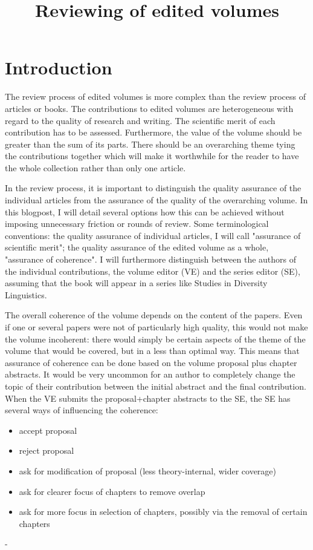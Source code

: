 \documentclass[border=20pt]{article}
\date{}
\title{Reviewing of edited volumes}
\begin{document}
 
\maketitle
\section*{Introduction}

\pagestyle{empty}

The review process of edited volumes is more complex than the review
process of articles or books. The contributions to edited volumes are
heterogeneous with regard to the quality of research and writing. The
scientific merit of each contribution has to be assessed. Furthermore,
the value of the volume should be greater than the sum of its parts.
There should be an overarching theme tying the contributions together
which will make it worthwhile for the reader to have the whole
collection rather than only one article.

In the review process, it is important to distinguish the quality
assurance of the individual articles from the assurance of the quality
of the overarching volume. In this blogpost, I will detail several
options how this can be achieved without imposing unnecessary friction
or rounds of review.  Some terminological conventions: the quality
assurance of individual articles, I will call "assurance of scientific
merit"; the quality assurance of the edited volume as a whole,
"assurance of coherence". I will furthermore distinguish between the
authors of the individual contributions, the volume editor (VE) and the
series editor (SE), assuming that the book will appear in a series like
Studies in Diversity Linguistics.

The overall coherence of the volume depends on the content of the
papers. Even if one or several papers were not of particularly high
quality, this would not make the volume incoherent: there would simply
be certain aspects of the theme of the volume that would be covered, but
in a less than optimal way. This means that assurance of coherence can
be done based on the volume proposal plus chapter abstracts. It would be
very uncommon for an author to completely change the topic of their
contribution between the initial abstract and the final contribution.
When the VE submits the proposal+chapter abstracts to the SE, the SE has
several ways of influencing the coherence:
\begin{itemize}
 \item  accept proposal
 \item  reject proposal
 \item  ask for modification of proposal (less theory-internal, wider coverage)
 \item  ask for clearer focus of chapters to remove overlap
 \item  ask for more focus in selection of chapters, possibly via the removal of certain chapters
\end{itemize}
-
\end{document}
